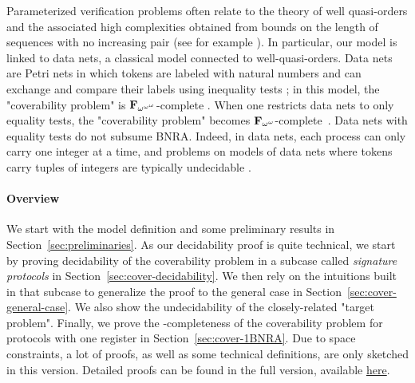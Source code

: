 Parameterized verification problems often relate to the theory of well quasi-orders
and the associated high complexities obtained from bounds on the length of sequences with no increasing pair (see for example \cite{WSTS}). 
In particular, our model is linked to data nets, a classical model connected to well-quasi-orders. Data nets are Petri nets in which tokens are labeled with natural numbers and can exchange and compare their labels using inequality tests \cite{LazicNORW08}; in this model, the "coverability problem" is $\mathbf{F}_{\omega^{\omega^{\omega}}}$-complete \cite{datanetsinequalityfomegaomegaomega}. When one restricts data nets to only equality tests, the "coverability problem" becomes $\mathbf{F}_{\omega^{\omega}}$-complete~\cite{Rosa-Velardo17}. Data nets with equality tests do not subsume BNRA. Indeed, in data nets, each process can only carry one integer at a time, and problems on models of data nets where tokens carry tuples of integers are typically undecidable \cite{Lasota16}.

\paragraph*{Overview}
We start with the model definition and some preliminary results in Section~\ref{sec:preliminaries}. As our decidability proof is quite technical, we start by proving decidability of the coverability problem in a subcase called \emph{signature protocols} in Section~\ref{sec:cover-decidability}.
We then rely on the intuitions built in that subcase to generalize the proof to the general case in Section~\ref{sec:cover-general-case}. We also show the undecidability of the closely-related "target problem".
Finally, we prove the \NP-completeness of the coverability problem for protocols with one register in Section~\ref{sec:cover-1BNRA}.
Due to space constraints, a lot of proofs, as well as some technical definitions, are only sketched in this version.
Detailed proofs can be found in the full version, available \href{https://arxiv.org/abs/2306.01517}{here}.

